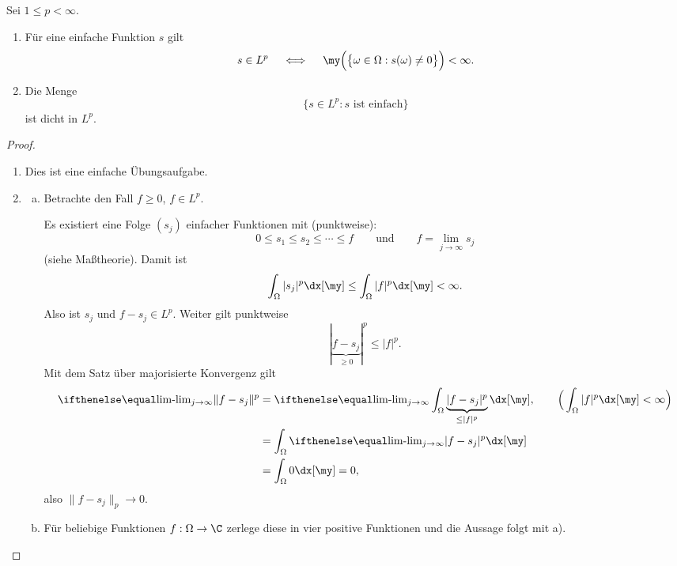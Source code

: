 \begin{st} \label{2.15}
	Sei $1 \le p < \infty$.
	\begin{enumerate}[1)]
		\item
			Für eine einfache Funktion $s$ gilt
			\[
				s \in L^p
				\quad \iff \quad
				\my\Big( \big\{ \omega \in \Omega : s(\omega) \neq 0 \big\} \Big) < \infty.
			\]
		\item
			Die Menge
			\[
				\Big\{ s \in L^p : s \text{ ist einfach} \Big\}
			\]
			ist dicht in $L^p$.
	\end{enumerate}
	\begin{proof}
		\begin{enumerate}[1)]
			\item
				Dies ist eine einfache Übungsaufgabe.
			\item
				\begin{enumerate}[a)]
					\item
						Betrachte den Fall $f \ge 0$, $f \in L^p$.

						Es existiert eine Folge $(s_j)$ einfacher Funktionen mit (punktweise):
						\[
							0 \le s_1 \le s_2 \le \dotsb \le f
							\qquad \text{und} \qquad
							f = \lim_{j\to \infty} s_j
						\]
						(siehe Maßtheorie).
						Damit ist
						\[
							\int_{\Omega} |s_j|^p \dx[\my]
							\le \int_{\Omega} |f|^p \dx[\my]
							< \infty.
						\]
						Also ist $s_j$ und $f-s_j \in L^p$.
						Weiter gilt punktweise
						\[
							|\underbrace{f - s_j}_{\ge 0}|^p \le |f|^p.
						\]
						Mit dem Satz über majorisierte Konvergenz gilt
						\begin{align*}
							\lim_{j\to \infty} \|f - s_j\|^p
							&= \lim_{j\to \infty} \int_{\Omega} \underbrace{|f-s_j|^p}_{\le |f|^p} \dx[\my],  \qquad \Big(\int_{\Omega} |f|^p \dx[\my] < \infty\Big)\\
							&= \int_{\Omega} \lim_{j\to \infty} |f- s_j |^p \dx[\my] \\
							&= \int_{\Omega} 0 \dx[\my]
							= 0,
						\end{align*}
						also $\|f-s_j\|_p \to 0$.
					\item
						Für beliebige Funktionen $f: \Omega \to \C$ zerlege diese in vier positive Funktionen und die Aussage folgt mit a).
				\end{enumerate}
		\end{enumerate}
	\end{proof}
\end{st}

